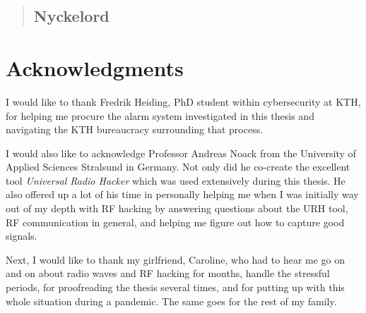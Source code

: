 \begin{abstract}
\todo

\subsection*{Nyckelord}
\todo

\end{abstract}

\clearpage

\section*{Acknowledgments}
I would like to thank Fredrik Heiding, PhD student within cybersecurity at KTH, for helping me procure the alarm system investigated in this thesis and navigating the KTH bureaucracy surrounding that process.

I would also like to acknowledge Professor Andreas Noack from the University of Applied Sciences Stralsund in Germany. Not only did he co-create the excellent tool \textit{Universal Radio Hacker} which was used extensively during this thesis. He also offered up a lot of his time in personally helping me when I was initially way out of my depth with RF hacking by answering questions about the URH tool, RF communication in general, and helping me figure out how to capture good signals.

Next, I would like to thank my girlfriend, Caroline, who had to hear me go on and on about radio waves and RF hacking for months, handle the stressful periods, for proofreading the thesis several times, and for putting up with this whole situation during a pandemic. The same goes for the rest of my family.

